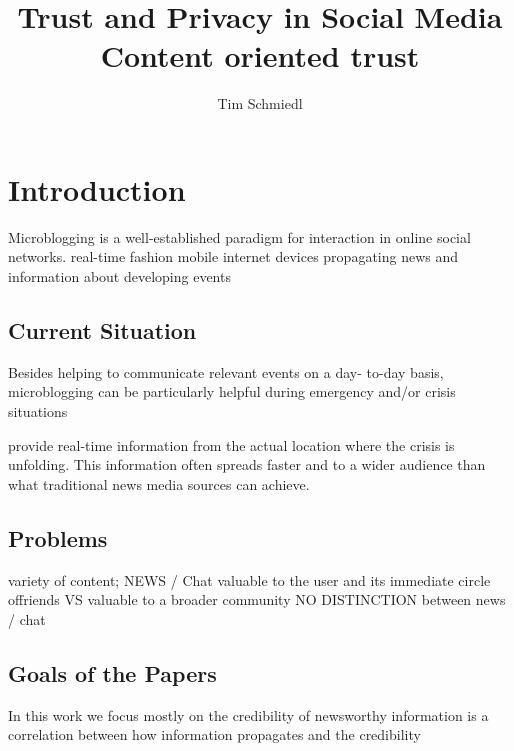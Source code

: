 \documentclass{proseminar}
\begin{document}

\title{Trust and Privacy in Social Media \\
\huge Content oriented trust}

\author{
Tim Schmiedl\\
}

\maketitle

\section{Introduction}
Microblogging is a well-established paradigm for interaction in online social networks.
 real-time fashion
 mobile internet devices
 propagating news and information about developing events

\subsection*{Current Situation}
 Besides helping to communicate relevant events on a day-
to-day basis, microblogging can be particularly helpful during emergency and/or crisis
situations

provide
real-time information from the actual location where the crisis is unfolding. This
information often spreads faster and to a wider audience than what traditional news
media sources can achieve.

\subsection*{Problems}
variety of content; NEWS / Chat
 valuable to the user and its immediate circle offriends VS  valuable to a broader community
NO DISTINCTION between news / chat


\subsection*{Goals of the Papers}
In this work we focus mostly on the credibility of newsworthy information
is a correlation between how information propagates and the credibility 
\end{document}
